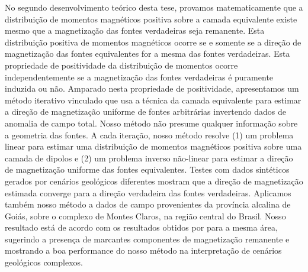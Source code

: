 No segundo desenvolvimento teórico desta tese, provamos matematicamente que a distribuição de momentos magnéticos positiva sobre a camada equivalente existe mesmo que a magnetização das fontes verdadeiras seja remanente. Esta distribuição positiva de momentos magnéticos ocorre se e somente se 
a direção de magnetização das fontes equivalentes for a mesma das fontes verdadeiras. Esta propriedade de positividade da distribuição de 
momentos ocorre independentemente se a magnetização das fontes verdadeiras é puramente induzida ou não. 
Amparado nesta propriedade de positividade, apresentamos um método iterativo vinculado que usa a técnica da camada equivalente para estimar a direção de magnetização uniforme de fontes arbitrárias invertendo dados de anomalia de campo total. Nosso método não presume qualquer informação sobre a geometria das fontes. A cada iteração, nosso método resolve (1) um problema linear para estimar uma distribuição de momentos magnéticos positiva sobre uma camada de dipolos e (2) um problema inverso não-linear para estimar a direção de magnetização uniforme das fontes equivalentes. Testes com dados sintéticos gerados por cenários geológicos diferentes mostram que a direção de magnetização estimada converge para a direção verdadeira das fontes verdadeiras. Aplicamos também nosso método a dados de campo provenientes da província alcalina de Goiás, sobre o complexo de Montes Claros, na região central do Brasil. Nosso resultado está de acordo com os resultados obtidos por \cite{zhang_etal_2018} para a mesma área, sugerindo a presença de marcantes componentes de magnetização remanente e mostrando a boa performance do nosso método na interpretação de cenários geológicos complexos. 



